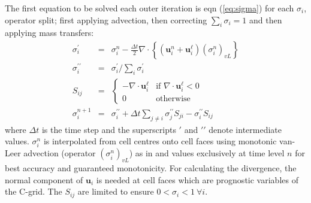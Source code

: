 \documentclass[draft]{agujournal2019}
\begin{document}
The first equation to be solved each outer iteration is eqn (\ref{eq:sigma})
for each $\sigma_{i}$, operator split; first applying advection,
then correcting $\sum_{i}\sigma_{i}=1$ and then applying mass transfers:
\begin{eqnarray}
\sigma_{i}^{\prime} & = & \sigma_{i}^{n}-\frac{\Delta t}{2}\nabla\cdot\left\{ \left(\mathbf{u}_{i}^{n}+\mathbf{u}_{i}^{\ell}\right)\left(\sigma_{i}^{n}\right)_{vL}\right\} \\
\sigma_{i}^{\prime\prime} & = & \sigma_{i}^{\prime}\bigg/\sum_{i}\sigma_{i}^{\prime}\\
S_{ij} & = & \begin{cases}
-\nabla\cdot\mathbf{u}_{i}^{\ell} & \text{if }\nabla\cdot\mathbf{u}_{i}^{\ell}<0\\
0 & \text{otherwise}
\end{cases}\\
\sigma_{i}^{n+1} & = & \sigma_{i}^{\prime\prime}+\Delta t\sum_{j\ne i}\sigma_{j}^{\prime\prime}S_{ji}-\sigma_{i}^{\prime\prime}S_{ij}
\end{eqnarray}
where $\Delta t$ is the time step and the superscripts $\prime$
and $\prime\prime$ denote intermediate values. $\sigma_{i}^{n}$
is interpolated from cell centres onto cell faces using monotonic
van-Leer advection (operator $(\sigma_{i}^{n})_{vL}$) as in 
and values exclusively at time level $n$ for best accuracy and guaranteed
monotonicity. For calculating the divergence, the normal component
of $\mathbf{u}_{i}$ is needed at cell faces which are prognostic
variables of the C-grid. The $S_{ij}$ are limited to ensure $0<\sigma_{i}<1\ \forall i$. 
\end{document}
